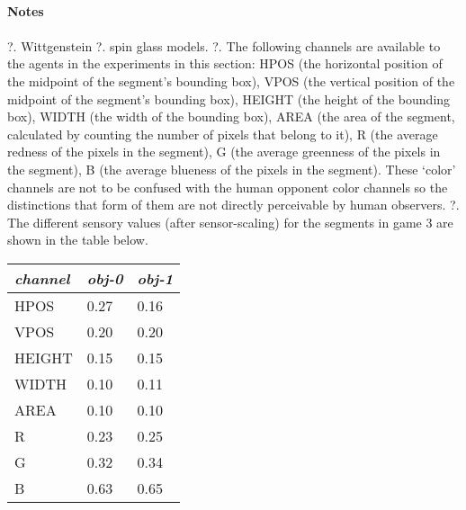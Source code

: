 
\bigskip
\paragraph{\bf Notes}
\paragraph{}
\footnotesize
\vspace{0.2cm}
\newline
\hspace{-0.5cm}
?. Wittgenstein
\vspace{0.2cm}
\newline
\hspace{-0.5cm}
?. spin glass models. 
\vspace{0.2cm}
\newline
\hspace{-0.5cm}
?. The following channels are available to the agents 
in the experiments in this section: 
HPOS (the horizontal position of the midpoint 
of the segment's bounding box), 
VPOS (the vertical position of the midpoint of the segment's 
bounding box), HEIGHT (the height of the bounding box), 
WIDTH (the width of the bounding box), AREA
(the area of the segment, calculated
by counting the number of pixels that belong to it), 
R (the average redness of the pixels in the segment), 
G (the average greenness of the pixels in the segment), 
B (the average blueness of the pixels in the segment). 
These `color' channels are not to be confused with the 
human opponent color channels so the distinctions 
that form of them are not directly perceivable by 
human observers. 
\vspace{0.2cm}
\newline
\hspace{-0.5cm}
?. The different sensory values (after sensor-scaling)
for the segments in game 3 are shown in the table below. 
\begin{center}
\begin{tabular}{| l | l | l |} \hline
{\it channel}& {\it obj-0} & {\it obj-1}\\ \hline
HPOS & 0.27 & 0.16\\ \hline
VPOS & 0.20 & 0.20\\ \hline
HEIGHT & 0.15 & 0.15\\ \hline
WIDTH & 0.10 & 0.11\\ \hline
AREA & 0.10 & 0.10\\ \hline
R & 0.23 & 0.25\\ \hline
G & 0.32 & 0.34\\ \hline
B & 0.63 & 0.65\\ \hline
\end{tabular}
\end{center}
